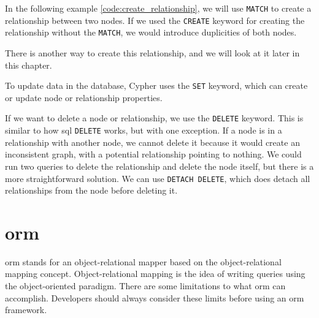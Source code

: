 In the following example \ref{code:create_relationship}, we will use \texttt{MATCH} to create a relationship between two nodes.
If we used the \texttt{CREATE} keyword for creating the relationship without the \texttt{MATCH}, we would introduce duplicities of both nodes.


There is another way to create this relationship, and we will look at it later in this chapter.

To update data in the database, Cypher uses the \texttt{SET} keyword, which can create or update node or relationship properties.

If we want to delete a node or relationship, we use the \texttt{DELETE} keyword.
This is similar to how \acrshort{sql} \texttt{DELETE} works, but with one exception. If a node is in a relationship
with another node, we cannot delete it because it would create an inconsistent graph, with a potential relationship pointing to nothing. \cite{neo4j_updating_nodate}
We could run two queries to delete the relationship and delete the node itself, but there is a more straightforward solution.
We can use \texttt{DETACH DELETE}, which does detach all relationships from the node before deleting it.

\section{\acrshort{orm}}
\acrshort{orm} stands for an object-relational mapper based on the object-relational mapping concept.
Object-relational mapping is the idea of writing queries using the object-oriented paradigm.
There are some limitations to what \acrshort{orm} can accomplish.
Developers should always consider these limits before using an \acrshort{orm} framework. \cite{hoyos_what_2018}

